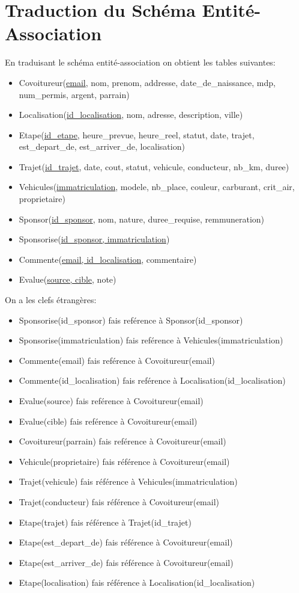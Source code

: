 




\section{Traduction du Schéma Entité-Association}
	En traduisant le schéma entité-association on obtient les tables suivantes:
	\begin{itemize}
		\item Covoitureur(\underline{email}, nom, prenom, addresse, date\_de\_naissance, mdp, num\_permis, argent, parrain)
		\item Localisation(\underline{id\_localisation}, nom, adresse, description, ville)
		\item Etape(\underline{id\_etape}, heure\_prevue, heure\_reel, statut, date, trajet, est\_depart\_de, est\_arriver\_de, localisation)
		\item Trajet(\underline{id\_trajet}, date, cout, statut, vehicule, conducteur, nb\_km, duree)
		\item Vehicules(\underline{immatriculation}, modele, nb\_place, couleur, carburant, crit\_air, proprietaire)
		\item Sponsor(\underline{id\_sponsor}, nom, nature, duree\_requise, remmuneration)
		
		
		\item Sponsorise(\underline{id\_sponsor, immatriculation})
		\item Commente(\underline{email, id\_localisation}, commentaire)
		\item Evalue(\underline{source, cible}, note)
	\end{itemize}
	On a les clefs étrangères:
	\begin{itemize}
		\item Sponsorise(id\_sponsor) fais reférence à Sponsor(id\_sponsor)
		\item Sponsorise(immatriculation) fais reférence à Vehicules(immatriculation)
		\item Commente(email) fais reférence à Covoitureur(email)
		\item Commente(id\_localisation) fais reférence à Localisation(id\_localisation)
		\item Evalue(source) fais reférence à Covoitureur(email)
		\item Evalue(cible) fais reférence à Covoitureur(email)
		\item Covoitureur(parrain) fais reférence à Covoitureur(email)
		\item Vehicule(proprietaire) fais référence à Covoitureur(email)
		\item Trajet(vehicule) fais référence à Vehicules(immatriculation)
		\item Trajet(conducteur) fais référence à Covoitureur(email)
		\item Etape(trajet) fais référence  à Trajet(id\_trajet)
		\item Etape(est\_depart\_de) fais référence à Covoitureur(email)
		\item Etape(est\_arriver\_de) fais référence à Covoitureur(email)
		\item Etape(localisation) fais référence à Localisation(id\_localisation)
	\end{itemize}
	
